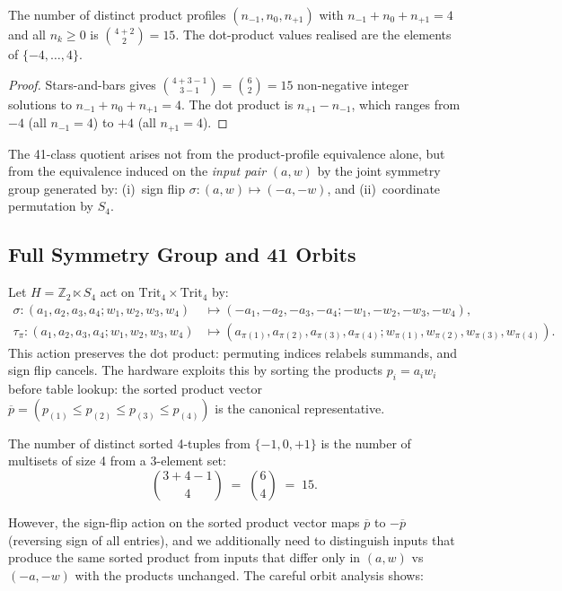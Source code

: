 \begin{proposition}
\label{prop:profile_count}
The number of distinct product profiles \((n_{-1}, n_0, n_{+1})\)
with \(n_{-1} + n_0 + n_{+1} = 4\) and all \(n_k \geq 0\) is
\(\binom{4+2}{2} = 15\).  The dot-product values realised are
the elements of \(\{-4,\ldots,4\}\).
\end{proposition}

\begin{proof}
Stars-and-bars gives \(\binom{4+3-1}{3-1} = \binom{6}{2} = 15\)
non-negative integer solutions to \(n_{-1}+n_0+n_{+1}=4\).
The dot product is \(n_{+1}-n_{-1}\), which ranges from \(-4\)
(all \(n_{-1}=4\)) to \(+4\) (all \(n_{+1}=4\)).
\end{proof}

The 41-class quotient arises not from the product-profile equivalence
alone, but from the equivalence induced on the \emph{input pair}
\((a,w)\) by the joint symmetry group generated by:
(i)~sign flip \(\sigma\colon (a,w)\mapsto(-a,-w)\), and
(ii)~coordinate permutation by \(S_4\).

\subsection{Full Symmetry Group and 41 Orbits}
\label{subsec:full_symmetry}

Let \(H = \mathbb{Z}_2 \ltimes S_4\) act on
\(\mathrm{Trit}_4 \times \mathrm{Trit}_4\) by:
\begin{align}
  \sigma \colon (a_1,a_2,a_3,a_4; w_1,w_2,w_3,w_4)
    &\mapsto (-a_1,-a_2,-a_3,-a_4; -w_1,-w_2,-w_3,-w_4), \\
  \tau_\pi \colon (a_1,a_2,a_3,a_4; w_1,w_2,w_3,w_4)
    &\mapsto (a_{\pi(1)},a_{\pi(2)},a_{\pi(3)},a_{\pi(4)};
             w_{\pi(1)},w_{\pi(2)},w_{\pi(3)},w_{\pi(4)}).
\end{align}
This action preserves the dot product: permuting indices relabels
summands, and sign flip cancels.  The hardware exploits this by sorting
the products \(p_i = a_i w_i\) before table lookup: the sorted
product vector \(\overline{p} = (p_{(1)} \leq p_{(2)} \leq p_{(3)} \leq
p_{(4)})\) is the canonical representative.

The number of distinct sorted 4-tuples from \(\{-1,0,+1\}\) is the
number of multisets of size 4 from a 3-element set:
\[
  \binom{3+4-1}{4} \;=\; \binom{6}{4} \;=\; 15.
\]

However, the sign-flip action on the sorted product vector maps
\(\overline{p}\) to \(-\overline{p}\) (reversing sign of all entries),
and we additionally need to distinguish inputs that produce the same
sorted product from inputs that differ only in \((a,w)\) vs \((-a,-w)\)
with the products unchanged.  The careful orbit analysis shows:

